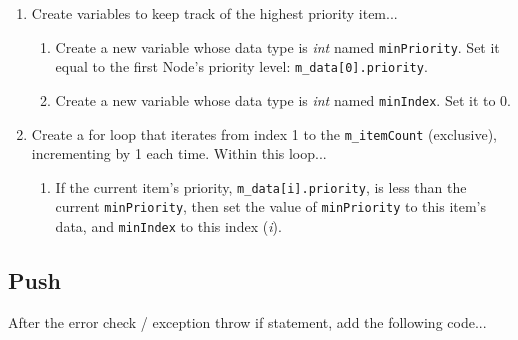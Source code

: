 \documentclass[a4paper,12pt,oneside]{book}
\begin{document}
    \begin{enumerate}
        \item   Create variables to keep track of the highest priority item...
            \begin{enumerate}
                \item   Create a new variable whose data type is \textit{int} named \texttt{minPriority}.
                    Set it equal to the first Node's priority level: \texttt{m\_data[0].priority}.
                \item   Create a new variable whose data type is \textit{int} named \texttt{minIndex}.
                    Set it to 0.
            \end{enumerate}

            \item Create a for loop that iterates from index 1 to the \texttt{m\_itemCount} (exclusive),
                incrementing by 1 each time. Within this loop...
            \begin{enumerate}
                \item   If the current item's priority, \texttt{m\_data[i].priority}, is less than the current \texttt{minPriority},
                    then set the value of \texttt{minPriority} to this item's data, and \texttt{minIndex} to this index (\textit{i}).
            \end{enumerate}
    \end{enumerate}

    \subsection{Push}

    After the error check / exception throw if statement, add the following code...
\end{document}

